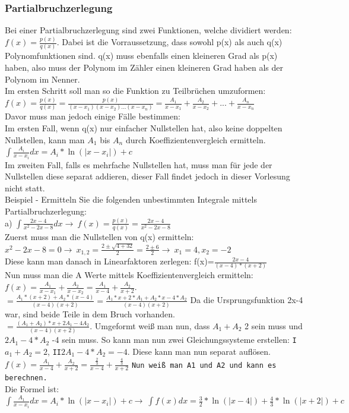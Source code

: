 \documentclass{article}
\begin{document}
	\subsubsection{Partialbruchzerlegung}
	Bei einer Partialbruchzerlegung sind zwei Funktionen, welche dividiert werden: $f(x)=\frac{p(x)}{q(x)}$. Dabei ist die Vorraussetzung, dass sowohl p(x) als auch q(x) Polynomfunktionen sind. q(x) muss ebenfalls einen kleineren Grad als p(x) haben, also muss der Polynom im Zähler einen kleineren Grad haben als der Polynom im Nenner. \\
	Im ersten Schritt soll man so die Funktion zu Teilbrüchen umzuformen: $f(x)=\frac{p(x)}{q(x)}=\frac{p(x)}{(x-x_1)(x-x_2)...(x-x_n)}=\frac{A_1}{x-x_1}+\frac{A_2}{x-x_2}+...+\frac{A_n}{x-x_n}$ \\
	Davor muss man jedoch einige Fälle bestimmen: \\
	Im ersten Fall, wenn q(x) nur einfacher Nullstellen hat, also keine doppelten Nullstellen, kann man $A_1$ bis $A_n$ durch Koeffizientenvergleich ermitteln. $\int \frac{A_i}{x-x_i}dx=A_i*\ln(|x-x_i|)+c$ \\
	Im zweiten Fall, falls es mehrfache Nullstellen hat, muss man für jede der Nullstellen diese separat addieren, dieser Fall findet jedoch in dieser Vorlesung nicht statt. \\
	Beispiel - Ermitteln Sie die folgenden unbestimmten Integrale mittels Partialbruchzerlegung: \\
	a) $\int \frac{2x-4}{x^2-2x-8}dx\to\ f(x)=\frac{p(x)}{q(x)}=\frac{2x-4}{x^2-2x-8}$ \\
	Zuerst muss man die Nullstellen von q(x) ermitteln: $x^2-2x-8=0\to\ x_{1,2}=\frac{2\pm\sqrt{4+32}}{2}=\frac{2\pm6}{2}\to\ x_1=4, x_2=-2$\\
	Diese kann man danach in Linearfaktoren zerlegen: f(x)=$\frac{2x-4}{(x-4)*(x+2)}$ \\
	Nun muss man die A Werte mittels Koeffizientenvergleich ermitteln: $f(x)=\frac{A_1}{x-x_1}+\frac{A_2}{x-x_2}=\frac{A_1}{x-4}+\frac{A_2}{x+2}$. \\
	$=\frac{A_1*(x+2)+A_2*(x-4)}{(x-4)(x+2)}=\frac{A_1*x+2*A_1+A_2*x-4*A_2}{(x-4)(x+2)}$ Da die Ursprungsfunktion 2x-4 war, sind beide Teile in dem Bruch vorhanden. \\
	$=\frac{(A_1+A_2)*x+2A_1-4A_2}{(x-4)(x+2)}$. Umgeformt weiß man nun, dass $A_1+A_2$ 2 sein muss und $2A_1-4*A_2$ -4 sein muss. So kann man nun zwei Gleichungssysteme erstellen: \verb|I|$a_1+A_2=2$, \verb|II|$2A_1-4*A_2=-4$. Diese kann man nun separat auflösen. \\
	$f(x)=\frac{A_1}{x-4}+\frac{A_2}{x+2}=\frac{\frac{2}{3}}{x-4}+\frac{\frac{4}{3}}{x+2}$ \verb|Nun weiß man A1 und A2 und kann es berechnen.| \\
	Die Formel ist: $\int \frac{A_1}{x-x_i}dx=A_i*\ln(|x-x_i|)+c\to\ \int f(x)dx=\frac{3}{2}*\ln(|x-4|)+\frac{4}{3}*\ln(|x+2|)+c$
\end{document}
